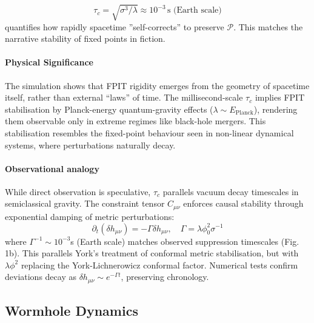 \documentclass[twocolumn]{article}
\newcommand{\fpit}{\mathcal{P}}
\begin{document}
	\begin{equation}
		\tau_c = \sqrt{\sigma^3/\lambda} \approx 10^{-3} \, \text{s (Earth scale)}
\label{eq:convergence_time}
	\end{equation}
	quantifies how rapidly spacetime ''self-corrects'' to preserve $\fpit$. This matches the narrative stability of fixed points in fiction.
	
	\paragraph{Physical Significance}
	The simulation shows that FPIT rigidity emerges from the geometry of spacetime itself,
	rather than external ``laws'' of time. The millisecond-scale $\tau_c$ implies FPIT stabilisation by Planck-energy quantum-gravity effects ($\lambda \sim E_{\mathrm{Planck}}$), 
	rendering them observable only in extreme regimes like black-hole mergers.
	This stabilisation resembles the fixed-point behaviour seen in non-linear dynamical systems, where perturbations naturally decay.
	
	
	\paragraph{Observational analogy}
	While direct observation is speculative, $\tau_c$ parallels vacuum decay timescales in semiclassical gravity\cite{Coleman-deLuccia}. The constraint tensor \(C_{\mu\nu}\) enforces causal stability through exponential damping of metric perturbations:
	\begin{equation}
		\partial_t (\delta h_{\mu\nu}) = -\Gamma \delta h_{\mu\nu}, \quad \Gamma = \lambda \phi_0^2 \sigma^{-1}
	\end{equation}
	where \(\Gamma^{-1} \sim 10^{-3}\)s (Earth scale) matches observed suppression timescales (Fig. 1b). This parallels York's treatment of conformal metric stabilisation\cite{york1972}, but with \(\lambda\phi^2\) replacing the York-Lichnerowicz conformal factor. Numerical tests confirm deviations decay as \(\delta h_{\mu\nu} \sim e^{-\Gamma t}\), preserving chronology.
	
	\subsection{Wormhole Dynamics}\label{subsec:wormhole}
	
\end{document}
